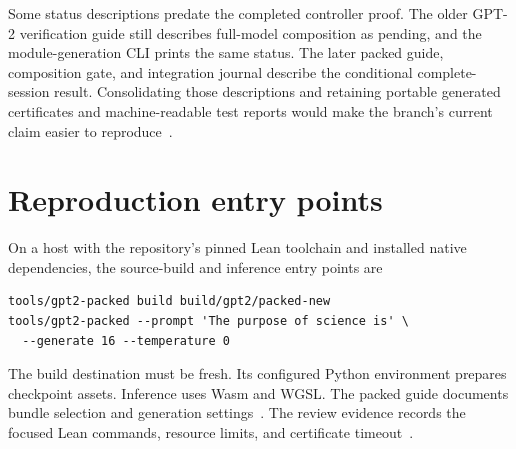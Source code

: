 \documentclass[11pt]{article}
\begin{document}
Some status descriptions predate the completed controller proof.  The older GPT-2 verification guide still describes full-model composition as pending, and the module-generation CLI prints the same status.  The later packed guide, composition gate, and integration journal describe the conditional complete-session result.  Consolidating those descriptions and retaining portable generated certificates and machine-readable test reports would make the branch's current claim easier to reproduce~\cite{packedguide,journal,build,bodytests}.

\section{Reproduction entry points}

On a host with the repository's pinned Lean toolchain and installed native dependencies, the source-build and inference entry points are
\begin{verbatim}
tools/gpt2-packed build build/gpt2/packed-new
tools/gpt2-packed --prompt 'The purpose of science is' \
  --generate 16 --temperature 0
\end{verbatim}
The build destination must be fresh.  Its configured Python environment prepares checkpoint assets.  Inference uses Wasm and WGSL.  The packed guide documents bundle selection and generation settings~\cite{packedguide,build}.  The review evidence records the focused Lean commands, resource limits, and certificate timeout~\cite{review}.
\end{document}
